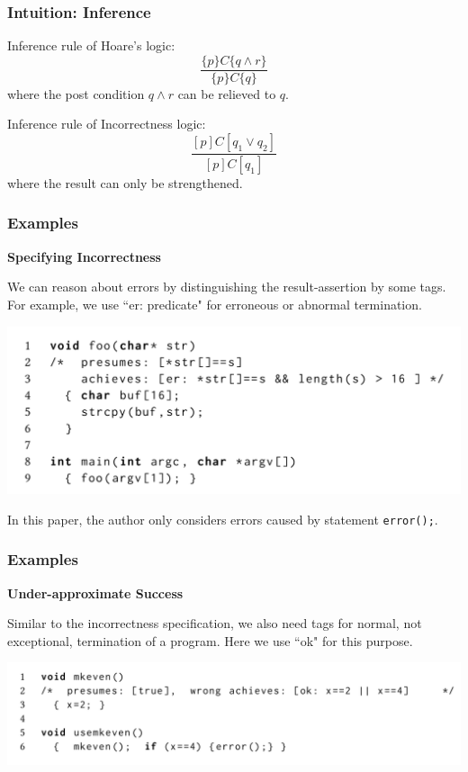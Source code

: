 \documentclass[11pt]{beamer}
\begin{document}
\begin{frame}\frametitle{Intuition: Inference}
Inference rule of Hoare's logic:
\[\dfrac{\{p\}C\{q\wedge r\}}{\{p\}C\{q\}}\]
where the post condition $q\wedge r$ can be relieved to $q$.

Inference rule of Incorrectness logic:
\[\dfrac{[p]C[q_1 \vee q_2]}{[p]C [q_1]}\]
where the result can only be strengthened. 
\end{frame}

\begin{frame}\frametitle{Examples}
\textbf{Specifying Incorrectness}

We can reason about errors by distinguishing the result-assertion by some tags.
For example, we use ``er: predicate" for erroneous or abnormal termination.
\begin{center}

\includegraphics[scale = 0.35]{5.PNG}

\end{center} 
In this paper, the author only considers errors caused by statement \texttt{error();}.
\end{frame}

\begin{frame}\frametitle{Examples}
\textbf{Under-approximate Success}

Similar to the incorrectness specification, we also need tags for normal, not exceptional, termination of a program. Here we use ``ok" for this purpose.
\begin{center}

\includegraphics[scale = 0.35]{6.PNG}

\end{center} 
\end{frame}
\end{document}
